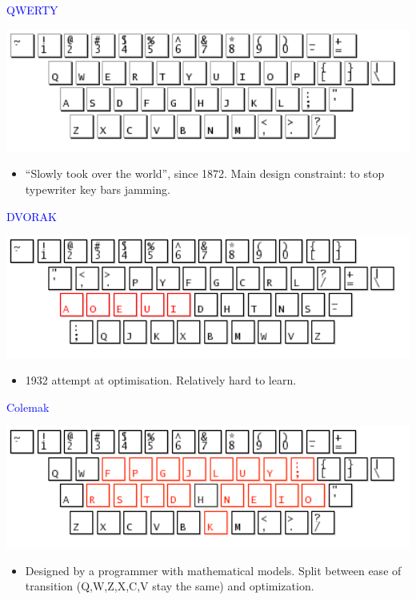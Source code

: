 \documentclass[landscape]{slides}
\begin{document}
\begin{slide}

    \textcolor{blue}{\Large{QWERTY}}

    \centering
    \includegraphics[width=20cm]{qwerty}

    \begin{itemize}
        \item ``Slowly took over the world'', since 1872. Main design constraint: to stop typewriter key bars jamming.
    \end{itemize}

\end{slide}


\begin{slide}

    \textcolor{blue}{\Large{DVORAK}}

    \centering
    \includegraphics[width=20cm]{dvorak}

    \begin{itemize}
        \item 1932 attempt at optimisation. Relatively hard to learn.
    \end{itemize}

\end{slide}


\begin{slide}

    \textcolor{blue}{\Large{Colemak}}

    \centering
    \includegraphics[width=20cm]{colemak-annot}

    \begin{itemize}
        \item Designed by a programmer with mathematical models. Split between ease of transition (Q,W,Z,X,C,V stay the same) and optimization.
    \end{itemize}

\end{slide}
\end{document}
